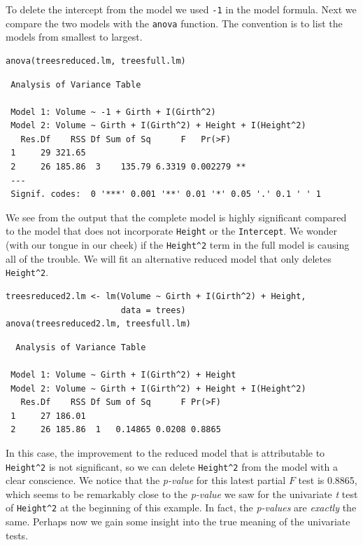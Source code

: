 \documentclass[captions=tableheading]{scrbook}
\begin{document}
\begin{example}
To delete the intercept from the model we used \texttt{-1} in the model formula. Next we compare the two models with the \texttt{anova} function. The convention is to list the models from smallest to largest.


\lstset{language=R}
\begin{lstlisting}
anova(treesreduced.lm, treesfull.lm)
\end{lstlisting}

\begin{verbatim}
 Analysis of Variance Table
 
 Model 1: Volume ~ -1 + Girth + I(Girth^2)
 Model 2: Volume ~ Girth + I(Girth^2) + Height + I(Height^2)
   Res.Df    RSS Df Sum of Sq      F   Pr(>F)   
 1     29 321.65                                
 2     26 185.86  3    135.79 6.3319 0.002279 **
 ---
 Signif. codes:  0 '***' 0.001 '**' 0.01 '*' 0.05 '.' 0.1 ' ' 1
\end{verbatim}

We see from the output that the complete model is highly significant compared to the model that does not incorporate \texttt{Height} or the \texttt{Intercept}. We wonder (with our tongue in our cheek) if the \texttt{Height\textasciicircum{}2} term in the full model is causing all of the trouble. We will fit an alternative reduced model that only deletes \texttt{Height\textasciicircum{}2}. 


\lstset{language=R}
\begin{lstlisting}
treesreduced2.lm <- lm(Volume ~ Girth + I(Girth^2) + Height, 
                       data = trees)
anova(treesreduced2.lm, treesfull.lm)
\end{lstlisting}

\begin{verbatim}
  Analysis of Variance Table
 
 Model 1: Volume ~ Girth + I(Girth^2) + Height
 Model 2: Volume ~ Girth + I(Girth^2) + Height + I(Height^2)
   Res.Df    RSS Df Sum of Sq      F Pr(>F)
 1     27 186.01                           
 2     26 185.86  1   0.14865 0.0208 0.8865
\end{verbatim}

In this case, the improvement to the reduced model that is attributable to \texttt{Height\textasciicircum{}2} is not significant, so we can delete \texttt{Height\textasciicircum{}2} from the model with a clear conscience. We notice that the \emph{p-value} for this latest partial \(F\) test is 0.8865, which seems to be remarkably close to the \emph{p-value} we saw for the univariate \emph{t} test of \texttt{Height\textasciicircum{}2} at the beginning of this example. In fact, the \emph{p-values} are \emph{exactly} the same. Perhaps now we gain some insight into the true meaning of the univariate tests.

\end{example}
\end{document}
